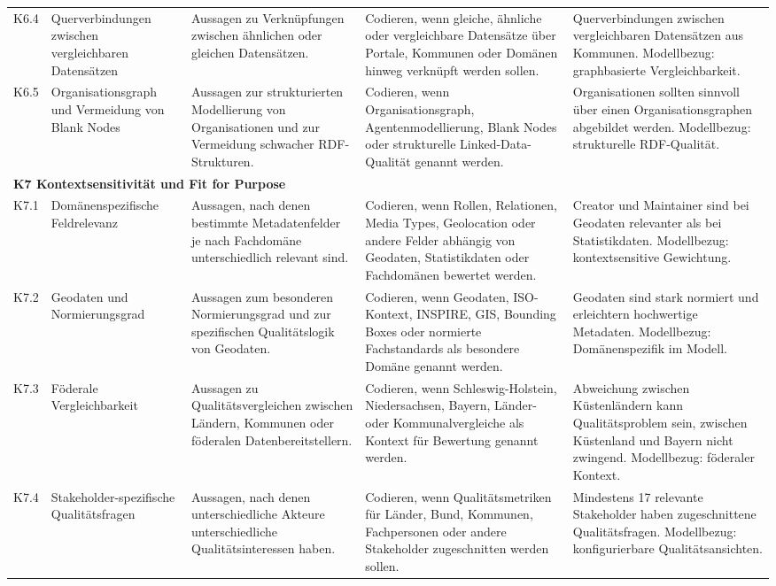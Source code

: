 \begin{longtable}{p{1cm} p{2.5cm} p{3.2cm} p{4.5cm} p{4.5cm}}
K6.4 & Querverbindungen zwischen vergleichbaren Datensätzen
& Aussagen zu Verknüpfungen zwischen ähnlichen oder gleichen Datensätzen.
& Codieren, wenn gleiche, ähnliche oder vergleichbare Datensätze über Portale, Kommunen oder Domänen hinweg verknüpft werden sollen.
& Querverbindungen zwischen vergleichbaren Datensätzen aus Kommunen. Modellbezug: graphbasierte Vergleichbarkeit. \\

K6.5 & Organisationsgraph und Vermeidung von Blank Nodes
& Aussagen zur strukturierten Modellierung von Organisationen und zur Vermeidung schwacher RDF-Strukturen.
& Codieren, wenn Organisationsgraph, Agentenmodellierung, Blank Nodes oder strukturelle Linked-Data-Qualität genannt werden.
& Organisationen sollten sinnvoll über einen Organisationsgraphen abgebildet werden. Modellbezug: strukturelle RDF-Qualität. \\

\midrule
\multicolumn{5}{l}{\textbf{K7 Kontextsensitivität und Fit for Purpose}} \\
\midrule

K7.1 & Domänenspezifische Feldrelevanz
& Aussagen, nach denen bestimmte Metadatenfelder je nach Fachdomäne unterschiedlich relevant sind.
& Codieren, wenn Rollen, Relationen, Media Types, Geolocation oder andere Felder abhängig von Geodaten, Statistikdaten oder Fachdomänen bewertet werden.
& Creator und Maintainer sind bei Geodaten relevanter als bei Statistikdaten. Modellbezug: kontextsensitive Gewichtung. \\

K7.2 & Geodaten und Normierungsgrad
& Aussagen zum besonderen Normierungsgrad und zur spezifischen Qualitätslogik von Geodaten.
& Codieren, wenn Geodaten, ISO-Kontext, INSPIRE, GIS, Bounding Boxes oder normierte Fachstandards als besondere Domäne genannt werden.
& Geodaten sind stark normiert und erleichtern hochwertige Metadaten. Modellbezug: Domänenspezifik im Modell. \\

K7.3 & Föderale Vergleichbarkeit
& Aussagen zu Qualitätsvergleichen zwischen Ländern, Kommunen oder föderalen Datenbereitstellern.
& Codieren, wenn Schleswig-Holstein, Niedersachsen, Bayern, Länder- oder Kommunalvergleiche als Kontext für Bewertung genannt werden.
& Abweichung zwischen Küstenländern kann Qualitätsproblem sein, zwischen Küstenland und Bayern nicht zwingend. Modellbezug: föderaler Kontext. \\

K7.4 & Stakeholder-spezifische Qualitätsfragen
& Aussagen, nach denen unterschiedliche Akteure unterschiedliche Qualitätsinteressen haben.
& Codieren, wenn Qualitätsmetriken für Länder, Bund, Kommunen, Fachpersonen oder andere Stakeholder zugeschnitten werden sollen.
& Mindestens 17 relevante Stakeholder haben zugeschnittene Qualitätsfragen. Modellbezug: konfigurierbare Qualitätsansichten. \\


\end{longtable}
